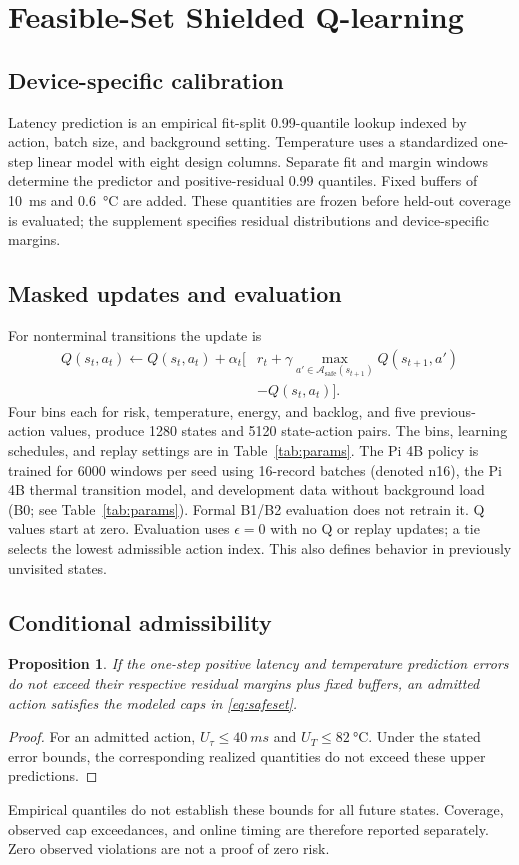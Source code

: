 \documentclass[journal]{IEEEtran}
\newtheorem{proposition}{Proposition}
\newcommand{\Asafe}{\mathcal{A}_{\mathrm{safe}}}
\begin{document}
\section{Feasible-Set Shielded Q-learning}
\subsection{Device-specific calibration}
Latency prediction is an empirical fit-split 0.99-quantile lookup indexed by action, batch size, and background setting. Temperature uses a standardized one-step linear model with eight design columns. Separate fit and margin windows determine the predictor and positive-residual 0.99 quantiles. Fixed buffers of \SI{10}{ms} and \SI{0.6}{\celsius} are added. These quantities are frozen before held-out coverage is evaluated; the supplement specifies residual distributions and device-specific margins.

\subsection{Masked updates and evaluation}
For nonterminal transitions the update is
\begin{equation}
\begin{split}
Q(s_t,a_t)\leftarrow Q(s_t,a_t)+\alpha_t\big[&r_t+\gamma\max_{a'\in\Asafe(s_{t+1})}Q(s_{t+1},a')\\
&-Q(s_t,a_t)\big].
\end{split}\label{eq:q}
\end{equation}
Four bins each for risk, temperature, energy, and backlog, and five previous-action values, produce 1280 states and 5120 state-action pairs. The bins, learning schedules, and replay settings are in Table~\ref{tab:params}. The Pi 4B policy is trained for 6000 windows per seed using 16-record batches (denoted n16), the Pi 4B thermal transition model, and development data without background load (B0; see Table~\ref{tab:params}). Formal B1/B2 evaluation does not retrain it. Q values start at zero. Evaluation uses $\epsilon=0$ with no Q or replay updates; a tie selects the lowest admissible action index. This also defines behavior in previously unvisited states.

\subsection{Conditional admissibility}
\begin{proposition}
If the one-step positive latency and temperature prediction errors do not exceed their respective residual margins plus fixed buffers, an admitted action satisfies the modeled caps in \eqref{eq:safeset}.
\end{proposition}
\begin{proof}
For an admitted action, $U_\tau\le\SI{40}{ms}$ and $U_T\le\SI{82}{\celsius}$. Under the stated error bounds, the corresponding realized quantities do not exceed these upper predictions.
\end{proof}
Empirical quantiles do not establish these bounds for all future states. Coverage, observed cap exceedances, and online timing are therefore reported separately. Zero observed violations are not a proof of zero risk.
\end{document}
